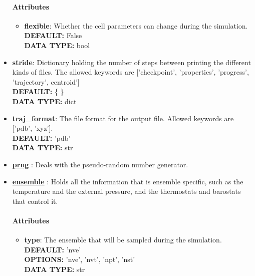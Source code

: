 \begin{itemize}
\paragraph{Attributes}
 \begin{itemize}
\item {\bf flexible}:
 Whether the cell parameters can change during the simulation.
{\\ \bf DEFAULT: }False
{\\ \bf DATA TYPE: }bool
\end{itemize}
 
\item {\bf stride}:
 Dictionary holding the number of steps between printing the different kinds of files. The allowed keywords are ['checkpoint', 'properties', 'progress', 'trajectory', centroid']
{\\ \bf DEFAULT: }\{ \}
{\\ \bf DATA TYPE: }dict
\item {\bf traj\_format}:
 The file format for the output file. Allowed keywords are ['pdb', 'xyz'].
{\\ \bf DEFAULT: }'pdb'
{\\ \bf DATA TYPE: }str
\item {\bf \hyperref[RANDOM]{prng} }:
 Deals with the pseudo-random number generator.
\item {\bf \hyperref[ENSEMBLE]{ensemble} }:
 Holds all the information that is ensemble specific, such as the temperature and the external pressure, and the thermostats and barostats that control it.
\paragraph{Attributes}
 \begin{itemize}
\item {\bf type}:
 The ensemble that will be sampled during the simulation.
{\\ \bf DEFAULT: }'nve'
{\\ \bf OPTIONS: }'nve', 'nvt', 'npt', 'nst'
{\\ \bf DATA TYPE: }str
\end{itemize}
 
\end{itemize}
 
